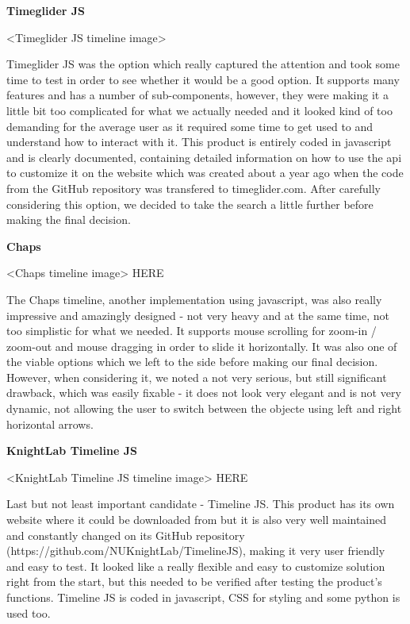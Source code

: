 \documentclass{l3proj}
\begin{document}
\textbf{Timeglider JS}

<Timeglider JS timeline image>

Timeglider JS was the option which really captured the attention and took some time to test in order to see whether it would be a good option. It supports many features and has a number of sub-components, however, they were making it a little bit too complicated for what we actually needed and it looked kind of too demanding for the average user as it required some time to get used to and understand how to interact with it. This product is entirely coded in javascript and is clearly documented, containing detailed information on how to use the api to customize it on the website which was created about a year ago when the code from the GitHub repository was transfered to timeglider.com. After carefully considering this option, we decided to take the search a little further before making the final decision.


\textbf{Chaps}

<Chaps timeline image> HERE

The Chaps timeline, another implementation using javascript, was also really impressive and amazingly designed - not very heavy and at the same time, not too simplistic for what we needed. It supports mouse scrolling for zoom-in / zoom-out and mouse dragging in order to slide it horizontally. It was also one of the viable options which we left to the side before making our final decision. However, when considering it, we noted a not very serious, but still significant drawback, which was easily fixable - it does not look very elegant and is not very dynamic, not allowing the user to switch between the objecte using left and right horizontal arrows.


\textbf{KnightLab Timeline JS}

<KnightLab Timeline JS timeline image> HERE

Last but not least important candidate - Timeline JS. This product has its own website where it could be downloaded from but it is also very well maintained and constantly changed on its GitHub repository (https://github.com/NUKnightLab/TimelineJS), making it very user friendly and easy to test. It looked like a really flexible and easy to customize solution right from the start, but this needed to be verified after testing the product’s functions. Timeline JS is coded in javascript, CSS for styling and some python is used too.
\end{document}
